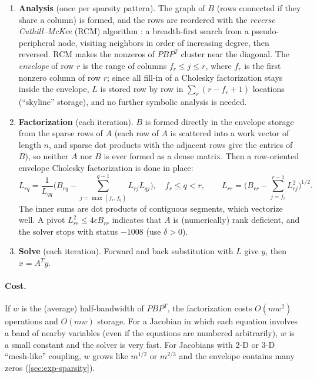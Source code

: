 \documentclass[11pt]{article}
\begin{document}
\begin{enumerate}
\item \textbf{Analysis} (once per sparsity pattern). The graph of $B$ (rows connected if they share
a column) is formed, and the rows are reordered with the \emph{reverse Cuthill--McKee} (RCM)
algorithm \cite{cuthill_mckee,george_liu}: a breadth-first search from a pseudo-peripheral node,
visiting neighbors in order of increasing degree, then reversed. RCM makes the nonzeros of $P B P^T$
cluster near the diagonal. The \emph{envelope} of row $r$ is the range of columns
$f_r \le j \le r$, where $f_r$ is the first nonzero column of row $r$; since all fill-in of a Cholesky
factorization stays inside the envelope, $L$ is stored row by row in
$\sum_r (r - f_r + 1)$ locations (``skyline'' storage), and no further symbolic analysis is needed.

\item \textbf{Factorization} (each iteration). $B$ is formed directly in the envelope storage from the
sparse rows of $A$ (each row of $A$ is scattered into a work vector of length $n$, and sparse dot
products with the adjacent rows give the entries of $B$), so neither $A$ nor $B$ is ever formed as a
dense matrix. Then a row-oriented envelope Cholesky factorization is done in place:
\begin{equation}
  L_{rq} = \frac{1}{L_{qq}}\Big( B_{rq} - \sum_{j=\max(f_r,f_q)}^{q-1} L_{rj} L_{qj} \Big), \quad f_r \le q < r,
  \qquad
  L_{rr} = \Big( B_{rr} - \sum_{j=f_r}^{r-1} L_{rj}^2 \Big)^{1/2}.
\end{equation}
The inner sums are dot products of contiguous segments, which vectorize well. A pivot
$L_{rr}^2 \le 4\epsilon B_{rr}$ indicates that $A$ is (numerically) rank deficient, and the solver
stops with status $-1008$ (use $\delta > 0$).

\item \textbf{Solve} (each iteration). Forward and back substitution with $L$ give $y$, then
$x = A^T y$.
\end{enumerate}

\paragraph{Cost.}
If $w$ is the (average) half-bandwidth of $P B P^T$, the factorization costs $O(m w^2)$ operations and
$O(m w)$ storage. For a Jacobian in which each equation involves a band of nearby variables (even if
the equations are numbered arbitrarily), $w$ is a small constant and the solver is very fast. For
Jacobians with 2-D or 3-D ``mesh-like'' coupling, $w$ grows like $m^{1/2}$ or $m^{2/3}$ and the envelope
contains many zeros (\cref{sec:exp-sparsity}).
\end{document}
